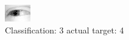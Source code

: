 \begin{figure}[h!]
\begin{center}
\includegraphics[width=0.60\columnwidth]{figures/ID2489_class_3_target_4.png}
\end{center}
\caption{ Classification: 3 actual target: 4}
\label{fig:ID2489_class_3_target_4}
\end{figure}
